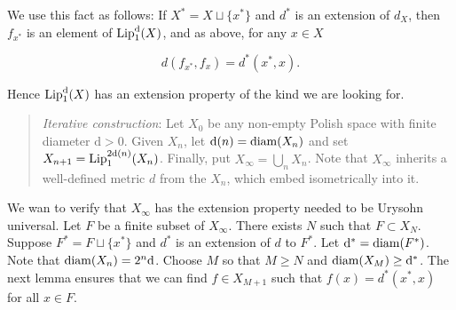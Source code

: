 We use this fact as follows: If $X^* = X \sqcup \{x^*\}$ and $d^*$ is an extension of $d_X$, then $f_{x^*}$ is an element of $\operatorname{Lip}^{\mathrm{d}}_1(X)$, and as above, for any $x \in X$

\begin{equation}
d(f_{x^*}, f_x) = d^*(x^*,x).
\end{equation}

Hence $\operatorname{Lip}^{\mathrm{d}}_1(X)$ has an extension property of the kind we are looking for.

\begin{quote}
\textit{Iterative construction}: Let $X_0$ be any non-empty Polish space with finite diameter $\mathrm{d} > 0$. Given $X_n$, let $\mathrm{d}(n) = \mathrm{diam}(X_n)$ and set $X_{n+1} = \operatorname{Lip}^{2\mathrm{d}(n)}_1(X_n)$. Finally, put $X_\infty = \bigcup_n X_n$. Note that $X_\infty$ inherits a well-defined metric $d$ from the $X_n$, which embed isometrically into it.
\end{quote}

We wan to verify that $X_\infty$ has the extension property needed to be Urysohn universal. Let $F$ be a finite subset of $X_\infty$. There exists $N$ such that $F \subset X_N$. Suppose $F^* = F \sqcup \{x^*\}$ and $d^*$ is an extension of $d$ to $F^*$. Let $\mathrm{d}^* = \mathrm{diam}(F^*)$. Note that $\mathrm{diam}(X_n) = 2^n \mathrm{d}$. Choose $M$ so that $M \geq N$ and $\mathrm{diam}(X_M) \geq \mathrm{d}^*$. The next lemma ensures that we can find $f \in X_{M+1}$ such that $f(x) = d^*(x^*,x)$ for all $x \in F$.

